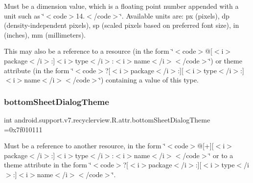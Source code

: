 Must be a dimension value, which is a floating point number appended with a unit such as \char`\"{}$<$code$>$14.\+5sp$<$/code$>$\char`\"{}. Available units are\+: px (pixels), dp (density-\/independent pixels), sp (scaled pixels based on preferred font size), in (inches), mm (millimeters). 

This may also be a reference to a resource (in the form \char`\"{}$<$code$>$@\mbox{[}$<$i$>$package$<$/i$>$\+:\mbox{]}$<$i$>$type$<$/i$>$\+:$<$i$>$name$<$/i$>$$<$/code$>$\char`\"{}) or theme attribute (in the form \char`\"{}$<$code$>$?\mbox{[}$<$i$>$package$<$/i$>$\+:\mbox{]}\mbox{[}$<$i$>$type$<$/i$>$\+:\mbox{]}$<$i$>$name$<$/i$>$$<$/code$>$\char`\"{}) containing a value of this type. \mbox{\label{classandroid_1_1support_1_1v7_1_1recyclerview_1_1R_1_1attr_aa260aaae22b7e1c120d812893327daee}} 
\subsubsection{\texorpdfstring{bottom\+Sheet\+Dialog\+Theme}{bottomSheetDialogTheme}}
{\footnotesize\ttfamily int android.\+support.\+v7.\+recyclerview.\+R.\+attr.\+bottom\+Sheet\+Dialog\+Theme =0x7f010111\hspace{0.3cm}{\ttfamily [static]}}

Must be a reference to another resource, in the form \char`\"{}$<$code$>$@\mbox{[}+\mbox{]}\mbox{[}$<$i$>$package$<$/i$>$\+:\mbox{]}$<$i$>$type$<$/i$>$\+:$<$i$>$name$<$/i$>$$<$/code$>$\char`\"{} or to a theme attribute in the form \char`\"{}$<$code$>$?\mbox{[}$<$i$>$package$<$/i$>$\+:\mbox{]}\mbox{[}$<$i$>$type$<$/i$>$\+:\mbox{]}$<$i$>$name$<$/i$>$$<$/code$>$\char`\"{}. \mbox{\label{classandroid_1_1support_1_1v7_1_1recyclerview_1_1R_1_1attr_a0cd2d399acba77cc845de42d837e7100}} 
